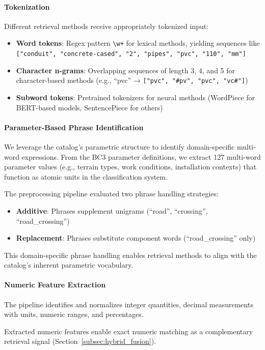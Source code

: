 \documentclass[preprint,12pt]{elsarticle}
\begin{document}
\paragraph{Tokenization}
Different retrieval methods receive appropriately tokenized input:
\begin{itemize}
    \item \textbf{Word tokens}: Regex pattern \texttt{\textbackslash w+} for lexical methods, yielding sequences like \texttt{["conduit", "concrete-cased", "2", "pipes", "pvc", "110", "mm"]}
    \item \textbf{Character n-grams}: Overlapping sequences of length 3, 4, and 5 for character-based methods (e.g., ``pvc'' → \texttt{["pvc", "\#pv", "pvc", "vc\#"]})
    \item \textbf{Subword tokens}: Pretrained tokenizers for neural methods (WordPiece for BERT-based models, SentencePiece for others)
\end{itemize}

\paragraph{Parameter-Based Phrase Identification}
We leverage the catalog's parametric structure to identify domain-specific multi-word expressions. From the BC3 parameter definitions, we extract 127 multi-word parameter values (e.g., terrain types, work conditions, installation contexts) that function as atomic units in the classification system.

The preprocessing pipeline evaluated two phrase handling strategies:
\begin{itemize}
    \item \textbf{Additive}: Phrases supplement unigrams (``road'', ``crossing'', ``road\_crossing'')
    \item \textbf{Replacement}: Phrases substitute component words (``road\_crossing'' only)
\end{itemize}

This domain-specific phrase handling enables retrieval methods to align with the catalog's inherent parametric vocabulary.

\paragraph{Numeric Feature Extraction}
The pipeline identifies and normalizes integer quantities, decimal measurements with units, numeric ranges, and percentages.

Extracted numeric features enable exact numeric matching as a complementary retrieval signal (Section~\ref{subsec:hybrid_fusion}).
\end{document}
